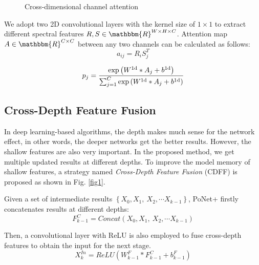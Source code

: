 \documentclass{article}
\begin{document}
\begin{itemize}
\begin{figure}[!h]
	\caption{Cross-dimensional channel attention}
	\label{fig2}
\end{figure}
\par{We adopt two 2D convolutional layers with the kernel size of $1\times1$ to extract different spectral features $R, S\in\mathbbm{R}^{W\times H\times C}$. Attention map $A\in\mathbbm{R}^{C\times C}$ between any two channels can be calculated as follows:}
\begin{equation}
a_{ij}=R_iS_j^T
\end{equation}
\par{}
\begin{equation}
p_j=\frac{\exp\left(W^{\rm{1d}}\ast A_j+b^{\rm{1d}}\right)}{\sum_{j=1}^{C}\exp\left(W^{\rm{1d}}\ast A_j+b^{\rm{1d}}\right)}
\end{equation}
\par{}
\subsection{Cross-Depth Feature Fusion}
\par{In deep learning-based algorithms, the depth makes much sense for the network effect, in other words, the deeper networks get the better results. However, the shallow features are also very important. In the proposed method, we get multiple updated results at different depths. To improve the model memory of shallow features, a strategy named \textit{Cross-Depth Feature Fusion} (CDFF) is proposed as shown in Fig. \ref{fig1}.}
\par{Given a set of intermediate results $\left\{X_0,X_1,\ X_2,\cdots X_{k-1}\right\}$, PoNet+ firstly concatenates results at different depths:}
\begin{equation}
F_{k-1}^C={Concat}(X_0,X_1,\ X_2,\cdots X_{k-1})
\end{equation}
\par{Then, a convolutional layer with ReLU is also employed to fuse cross-depth features to obtain the input for the next stage.}
\begin{equation}
X_k^{In}={ReLU}(W_{k-1}^F\ast F_{k-1}^C+b_{k-1}^F)
\end{equation}
\par{}

\end{itemize}
\end{document}
